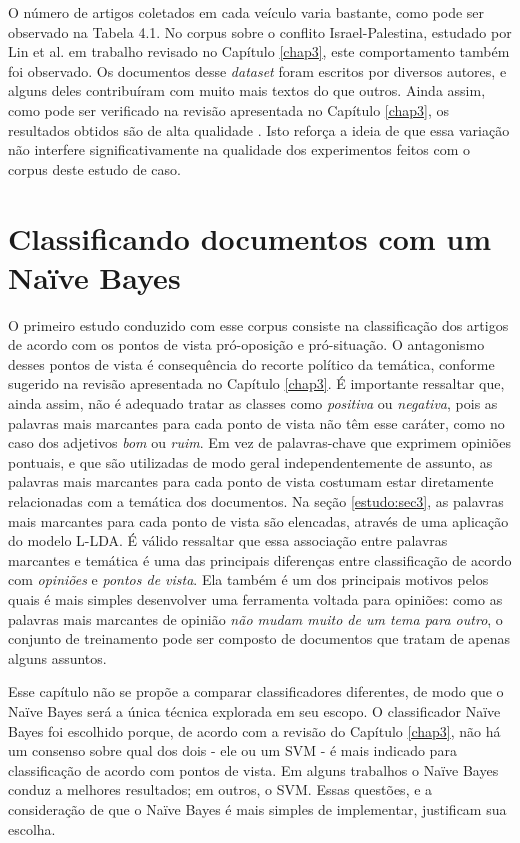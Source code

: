 O número de artigos coletados em cada veículo varia bastante, como pode ser observado na Tabela 4.1. No corpus sobre o conflito Israel-Palestina, estudado por Lin et al. em trabalho revisado no Capítulo \ref{chap3}, este comportamento também foi observado. Os documentos desse \emph{dataset} foram escritos por diversos autores, e alguns deles contribuíram com muito mais textos do que outros. Ainda assim, como pode ser verificado na revisão apresentada no Capítulo \ref{chap3}, os resultados obtidos são de alta qualidade \cite{lin-et-al2006}. Isto reforça a ideia de que essa variação não interfere significativamente na qualidade dos experimentos feitos com o corpus deste estudo de caso.


\section{Classificando documentos com um Naïve Bayes}
\label{estudo:sec2}

O primeiro estudo conduzido com esse corpus consiste na classificação dos artigos de acordo com os pontos de vista pró-oposição e pró-situação. O antagonismo desses pontos de vista é consequência do recorte político da temática, conforme sugerido na revisão apresentada no Capítulo \ref{chap3}. É importante ressaltar que, ainda assim, não é adequado tratar as classes como \emph{positiva} ou \emph{negativa}, pois as palavras mais marcantes para cada ponto de vista não  têm esse caráter, como no caso dos adjetivos \emph{bom} ou \emph{ruim}. Em vez de palavras-chave que exprimem opiniões pontuais, e que são utilizadas de modo geral independentemente de assunto, as palavras mais marcantes para cada ponto de vista costumam estar diretamente relacionadas com a temática dos documentos. Na seção \ref{estudo:sec3}, as palavras mais marcantes para cada ponto de vista são elencadas, através de uma aplicação do modelo L-LDA. É válido ressaltar que essa associação entre palavras marcantes e temática é uma das principais diferenças entre classificação de acordo com \emph{opiniões} e \emph{pontos de vista}. Ela também é um dos principais motivos pelos quais é mais simples desenvolver uma ferramenta voltada para opiniões: como as palavras mais marcantes de opinião \emph{não mudam muito de um tema para outro}, o conjunto de treinamento pode ser composto de documentos que tratam de apenas alguns assuntos.

Esse capítulo não se propõe a comparar classificadores diferentes, de modo que o Naïve Bayes será a única técnica explorada em seu escopo. O classificador Naïve Bayes foi escolhido porque, de acordo com a revisão do Capítulo \ref{chap3}, não há um consenso sobre qual dos dois - ele ou um SVM - é mais indicado para classificação de acordo com pontos de vista. Em alguns trabalhos o Naïve Bayes conduz a melhores resultados; em outros, o SVM. Essas questões, e a consideração de que o Naïve Bayes é mais simples de implementar, justificam sua escolha.  

